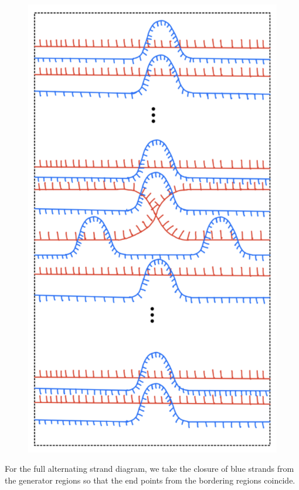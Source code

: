 \begin{figure}[H] 
    \centering
    \includegraphics[scale = 0.95]{diagrams/natural_alternating_diagrams/9.png}
    \caption{}
    \label{fig:your-label}
\end{figure}

For the full alternating strand diagram, we take the closure of blue strands from the generator regions so that the end points from the bordering regions coincide.

